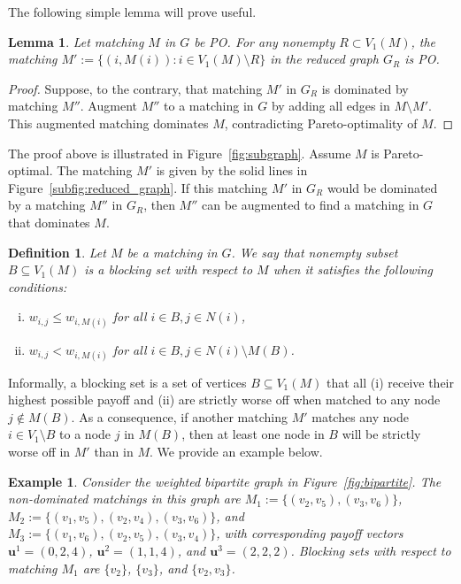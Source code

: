 \documentclass[a4paper, 11pt]{article}
\newtheorem{defin}[thm]{Definition}
\newtheorem{lem}[thm]{Lemma}
\newtheorem{ex}[thm]{Example}
\begin{document}
The following simple lemma will prove useful.
\begin{lem}\label{lem:submatrix}
Let matching $M$ in $G$ be PO. For any nonempty $R \subset V_1(M)$, the matching $M' := \{ (i, M(i)) : i \in V_1(M)\setminus R\}$ in the reduced graph $G_R$ is PO. 
\end{lem}
\begin{proof}
Suppose, to the contrary, that matching $M'$ in $G_{R}$ is dominated by matching $M''$. Augment $M''$ to a matching in $G$ by adding all edges in $M \setminus M'$. This augmented matching dominates $M$, contradicting Pareto-optimality of $M$.
\end{proof}
The proof above is illustrated in Figure~\ref{fig:subgraph}. Assume $M$ is Pareto-optimal. The matching $M'$ is given by the solid lines in Figure~\ref{subfig:reduced_graph}. If this matching $M'$ in $G_R$ would be dominated by a matching $M''$ in $G_R$, then $M''$ can be augmented to find a matching in $G$ that dominates $M$. 

\begin{defin}
\label{def:blocking}
Let $M$ be a matching in $G$. We say that nonempty subset $B \subseteq V_1(M)$ is a blocking set with respect to $M$ when it satisfies the following conditions:
\begin{enumerate}[(i)]
    \item $w_{i,j} \leq w_{i, M(i)}$ for all $i \in B, j \in N(i)$, 
    \item $w_{i,j} < w_{i,M(i)}$ for all $i \in B, j \in N(i) \setminus M(B)$.
\end{enumerate}
\end{defin}
Informally, a blocking set is a set of vertices $B\subseteq V_1(M)$ that all (i) receive their highest possible payoff and (ii) are strictly worse off when matched to any node $j \notin M(B)$. As a consequence, if another matching $M'$ matches any node $i\in V_1\setminus B$ to a node $j$ in $M(B)$, then at least one node in $B$ will be strictly worse off in $M'$ than in $M$. We provide an example below.
\begin{ex}
\label{ex:blocking}
Consider the weighted bipartite graph in Figure~\ref{fig:bipartite}. The non-dominated matchings in this graph are $M_1 := \{ (v_2, v_5), (v_3, v_6)\}$, $M_2 := \{ (v_1, v_5), (v_2, v_4), (v_3, v_6)\}$, and $M_3 := \{ (v_1, v_6), (v_2, v_5), (v_3, v_4)\}$, with corresponding payoff vectors $\bm{u}^1 = (0, 2, 4)$, $\bm{u}^2 = (1, 1, 4)$, and $\bm{u}^3 = (2, 2, 2)$. Blocking sets with respect to matching $M_1$ are $\{ v_2 \}$, $\{v_3\}$, and $\{v_2, v_3\}$.


\end{ex}
\end{document}

